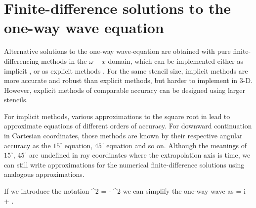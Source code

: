\section{Finite-difference solutions to the one-way wave equation}
Alternative solutions to the one-way wave-equation are 
obtained with pure finite-differencing methods in the 
$\omega-x$ domain, which can be implemented either as 
implicit \cite[]{Claerbout.blackwell.85}, or as 
explicit methods \cite[]{GEO.56.11.17701777}.
For the same stencil size,
implicit methods are more accurate and robust than explicit methods, 
but harder to implement in {3-D}.
However, explicit methods of comparable accuracy can be 
designed using larger stencils.
\par
For implicit methods, various approximations to the 
square root in  lead to approximate equations 
of different orders of accuracy. 
For downward continuation in Cartesian coordinates, 
those methods are known by their respective angular 
accuracy as the $15^\circ$ equation, $45^\circ$ 
equation and so on. 
Although the meanings of $15^\circ$, $45^\circ$ are
undefined in ray coordinates where the extrapolation axis 
is time, we can still write approximations for 
the numerical finite-difference solutions using analogous 
approximations.
\par
If we introduce the notation
\beq
\ko^2 =  - \lp\frac{\cz}{2\czz}\rp^2
\eeq
we can simplify the one-way wave  as
\beq \label{eqn:oneway.3d.b}
\kz = i \frac{\cz}{2\czz} +
\;.
\eeq

